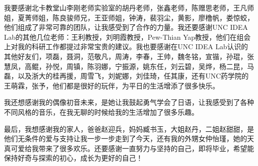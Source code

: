 我要感谢北卡教堂山李刚老师实验室的胡丹老师，张鑫老师，陈赠思老师，王凡师姐，夏菁师姐，陈良骏师兄，王亚师姐，钟涛，裴羽尘，黄影，廖橹帆，娄惊蛟，他们组成了非常可靠的团队，让我感受到了合作的力量。我还要感谢UNC IDEA Lab的其他几位老师：王利教授，刘明霞教授，Pew-Thian Yap教授，他们在组会上对我的科研工作都提过非常宝贵的建议。我也要感谢在UNC IDEA Lab认识的其他好友们，项磊，聂洞，范敬凡，周涛，李春，王帅，魏冬铭，宣锴，孙琨，张慧凤，高鲲，孙悦，周镇，陈羽娜，宁振源，姚东任，刘云碧，吴烨，杨二昆，马磊，以及浙大的桂再援，周雪飞，刘妮娜，刘佳琦，任其康，还有UNC药学院的王萌霖，张予，他们都是很好的玩伴，为平日的生活增添了很多快乐。

我还想感谢我的偶像初音未来，是她让我鼓起勇气学会了日语，让我感受到了各种不同风格的音乐，在我无聊的时候给我的生活增加了很多乐趣。

最后，我想感谢我的家人，爸爸赵迎兵，妈妈臧书玉，大姐赵丹，二姐赵甜甜，是他们无条件的爱与支持让我一步一步走到了今天，还有我的外甥女仲怡瑾，她的天真可爱给我带来了很多欢乐。还要感谢一直努力与坚持的自己，即将毕业，希望能保持好奇与探索的初心，成长为更好的自己！

